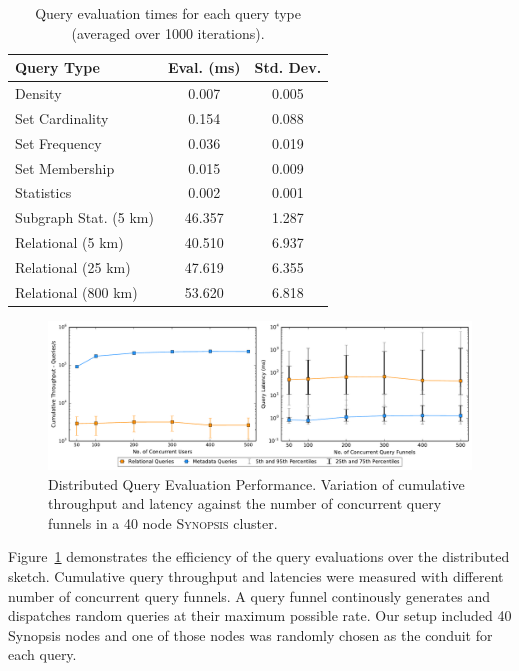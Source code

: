 \begin{table}[h!]
    \renewcommand{\arraystretch}{1.4}
    \caption{Query evaluation times for each query type (averaged over 1000 iterations).}
    \label{tbl:query-times}
    \begin{center}
        \begin{tabular}{|l|c|c|}
            \hline
            \textbf{Query Type}      & \textbf{Eval. (ms)} & \textbf{Std. Dev.} \\
            \hline
            Density                  & 0.007                    & 0.005 \\
            \hline
            Set Cardinality          & 0.154                    & 0.088 \\
            \hline
            Set Frequency            & 0.036                    & 0.019 \\
            \hline
            Set Membership           & 0.015                    & 0.009 \\
            \hline
            Statistics               & 0.002                    & 0.001 \\
            \hline
            \hline
            Subgraph Stat. (5 km)    & 46.357                   & 1.287 \\
            \hline
            Relational (5 km)        & 40.510                   & 6.937 \\
            \hline
            Relational (25 km)       & 47.619                   & 6.355 \\
            \hline
            Relational (800 km)      & 53.620                   & 6.818 \\
            \hline
        \end{tabular}
    \end{center}
\end{table}
\begin{figure}
    \centerline{\includegraphics[width=\linewidth]{figures/query_benchmark_both.pdf}}
    \caption{Distributed Query Evaluation Performance. Variation of cumulative throughput and latency against the number of concurrent query funnels in a 40 node \textsc{Synopsis} cluster.}
    \label{fig:dist-query}
\end{figure}

Figure~\ref{fig:dist-query} demonstrates the efficiency of the query evaluations over the distributed sketch.
Cumulative query throughput and latencies were measured with different number of concurrent query funnels.
A query funnel continously generates and dispatches random queries at their maximum possible rate.
Our setup included 40 Synopsis nodes and one of those nodes was randomly chosen as the conduit for each query.



